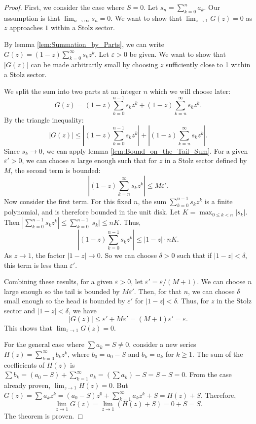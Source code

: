 \begin{proof}
    First, we consider the case where $S=0$. Let $s_n = \sum_{k=0}^{n} a_k$. Our assumption is that $\lim_{n \to \infty} s_n = 0$. We want to show that $\lim_{z \to 1} G(z) = 0$ as $z$ approaches $1$ within a Stolz sector.

    By lemma \ref{lem:Summation_by_Parts}, we can write $G(z) = (1-z) \sum_{k=0}^{\infty} s_k z^k$.
    Let $\varepsilon > 0$ be given. We want to show that $|G(z)|$ can be made arbitrarily small by choosing $z$ sufficiently close to 1 within a Stolz sector.

    We split the sum into two parts at an integer $n$ which we will choose later:
    \[
        G(z) = (1-z)\sum_{k=0}^{n-1} s_k z^k + (1-z)\sum_{k=n}^{\infty} s_k z^k.
    \]
    By the triangle inequality:
    \[
        |G(z)| \leq \left|(1-z)\sum_{k=0}^{n-1} s_k z^k\right| + \left|(1-z)\sum_{k=n}^{\infty} s_k z^k\right|.
    \]
    Since $s_k \to 0$, we can apply lemma \ref{lem:Bound_on_the_Tail_Sum}. For a given $\varepsilon' > 0$, we can choose $n$ large enough such that for $z$ in a Stolz sector defined by $M$, the second term is bounded:
    \[
        \left|(1-z)\sum_{k=n}^{\infty} s_k z^k\right| \leq M\varepsilon'.
    \]
    Now consider the first term. For this fixed $n$, the sum $\sum_{k=0}^{n-1} s_k z^k$ is a finite polynomial, and is therefore bounded in the unit disk. Let $K = \max_{0 \le k < n} |s_k|$. Then $|\sum_{k=0}^{n-1} s_k z^k| \leq \sum_{k=0}^{n-1} |s_k| \leq nK$. Thus,
    \[
        \left|(1-z)\sum_{k=0}^{n-1} s_k z^k\right| \leq |1-z| \cdot nK.
    \]
    As $z \to 1$, the factor $|1-z| \to 0$. So we can choose $\delta > 0$ such that if $|1-z| < \delta$, this term is less than $\varepsilon'$.

    Combining these results, for a given $\varepsilon > 0$, let $\varepsilon' = \varepsilon / (M+1)$. We can choose $n$ large enough so the tail is bounded by $M\varepsilon'$. Then, for that $n$, we can choose $\delta$ small enough so the head is bounded by $\varepsilon'$ for $|1-z| < \delta$.
    Thus, for $z$ in the Stolz sector and $|1-z| < \delta$, we have
    \[
        |G(z)| \leq \varepsilon' + M\varepsilon' = (M+1)\varepsilon' = \varepsilon.
    \]
    This shows that $\lim_{z \to 1} G(z) = 0$.

    For the general case where $\sum a_k = S \neq 0$, consider a new series $H(z) = \sum_{k=0}^\infty b_k z^k$, where $b_0 = a_0 - S$ and $b_k = a_k$ for $k \geq 1$. The sum of the coefficients of $H(z)$ is $\sum b_k = (a_0 - S) + \sum_{k=1}^\infty a_k = (\sum a_k) - S = S - S = 0$.
    From the case already proven, $\lim_{z \to 1} H(z) = 0$.
    But $G(z) = \sum a_k z^k = (a_0 - S)z^0 + \sum_{k=1}^\infty a_k z^k + S = H(z) + S$.
    Therefore,
    \[
        \lim_{z \to 1} G(z) = \lim_{z \to 1} (H(z) + S) = 0 + S = S.
    \]
    The theorem is proven.
\end{proof}
